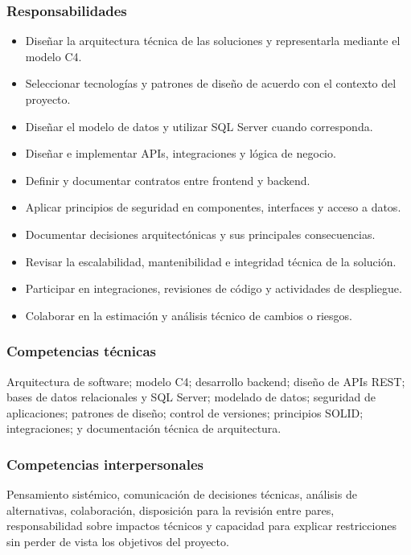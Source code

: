 \subsubsection{Responsabilidades}
\begin{itemize}
  \item Diseñar la arquitectura técnica de las soluciones y representarla mediante el modelo C4.
  \item Seleccionar tecnologías y patrones de diseño de acuerdo con el contexto del proyecto.
  \item Diseñar el modelo de datos y utilizar SQL Server cuando corresponda.
  \item Diseñar e implementar APIs, integraciones y lógica de negocio.
  \item Definir y documentar contratos entre frontend y backend.
  \item Aplicar principios de seguridad en componentes, interfaces y acceso a datos.
  \item Documentar decisiones arquitectónicas y sus principales consecuencias.
  \item Revisar la escalabilidad, mantenibilidad e integridad técnica de la solución.
  \item Participar en integraciones, revisiones de código y actividades de despliegue.
  \item Colaborar en la estimación y análisis técnico de cambios o riesgos.
\end{itemize}

\subsubsection{Competencias técnicas}

Arquitectura de software; modelo C4; desarrollo backend; diseño de APIs REST;
bases de datos relacionales y SQL Server; modelado de datos; seguridad de
aplicaciones; patrones de diseño; control de versiones; principios SOLID;
integraciones; y documentación técnica de arquitectura.

\subsubsection{Competencias interpersonales}

Pensamiento sistémico, comunicación de decisiones técnicas, análisis de
alternativas, colaboración, disposición para la revisión entre pares,
responsabilidad sobre impactos técnicos y capacidad para explicar restricciones
sin perder de vista los objetivos del proyecto.


